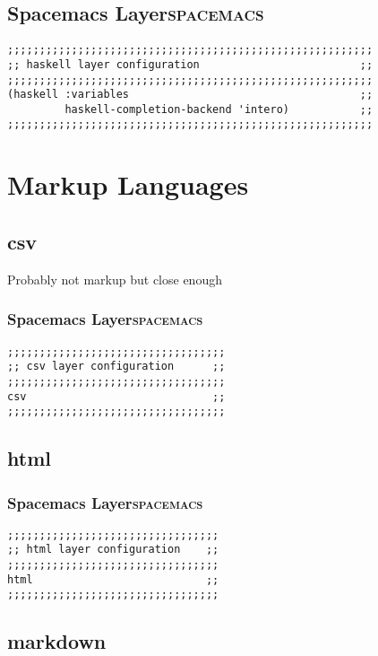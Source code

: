 \documentclass[11pt]{article}
\begin{document}
\subsection{Spacemacs Layer\hfill{}\textsc{spacemacs}}
\label{sec:orgd68aad7}
\begin{verbatim}
;;;;;;;;;;;;;;;;;;;;;;;;;;;;;;;;;;;;;;;;;;;;;;;;;;;;;;;;;
;; haskell layer configuration                         ;;
;;;;;;;;;;;;;;;;;;;;;;;;;;;;;;;;;;;;;;;;;;;;;;;;;;;;;;;;;
(haskell :variables                                    ;;
         haskell-completion-backend 'intero)           ;;
;;;;;;;;;;;;;;;;;;;;;;;;;;;;;;;;;;;;;;;;;;;;;;;;;;;;;;;;;
\end{verbatim}

\section{Markup Languages}
\label{sec:orgad48858}
\subsection{csv}
\label{sec:org5978683}
Probably not markup but close enough
\subsubsection{Spacemacs Layer\hfill{}\textsc{spacemacs}}
\label{sec:org0b3ae9b}
\begin{verbatim}
;;;;;;;;;;;;;;;;;;;;;;;;;;;;;;;;;;
;; csv layer configuration      ;;
;;;;;;;;;;;;;;;;;;;;;;;;;;;;;;;;;;
csv                             ;;
;;;;;;;;;;;;;;;;;;;;;;;;;;;;;;;;;;
\end{verbatim}

\subsection{html}
\label{sec:org3e7ce5d}
\subsubsection{Spacemacs Layer\hfill{}\textsc{spacemacs}}
\label{sec:orgda45262}
\begin{verbatim}
;;;;;;;;;;;;;;;;;;;;;;;;;;;;;;;;;
;; html layer configuration    ;;
;;;;;;;;;;;;;;;;;;;;;;;;;;;;;;;;;
html                           ;;
;;;;;;;;;;;;;;;;;;;;;;;;;;;;;;;;;
\end{verbatim}

\subsection{markdown}
\label{sec:org236bc25}
\end{document}
